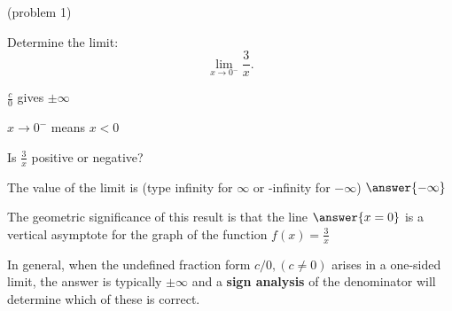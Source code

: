 \documentclass[handout]{ximera}
\begin{document}
\begin{problem}(problem 1)
  
	Determine the limit:
  \[
  \lim_{x \to 0^-} \frac{3}{x}.
  \]
		
		\begin{hint}
      $\frac{c}{0}$ gives $\pm \infty$
    \end{hint}
    \begin{hint}
      $x \to 0^-$ means $x<0$
    \end{hint}
    \begin{hint}
      Is $\frac{3}{x}$ positive or negative?
    \end{hint}
    
		The value of the limit  is
		(type infinity for $\infty$ or -infinity for $-\infty$)
		 $\answer{-\infty}$
		
		The geometric significance of this result is that the line $\answer{x=0}$ 
is a vertical asymptote for the graph of the function $f(x) = \frac{3}{x}$
		
\end{problem}
In general, when the undefined fraction form $c/0, (c\neq 0)$
arises in a one-sided limit, the answer is typically $\pm \infty$ and
a \textbf{sign analysis} of the denominator will determine which of these is correct.
\end{document}
